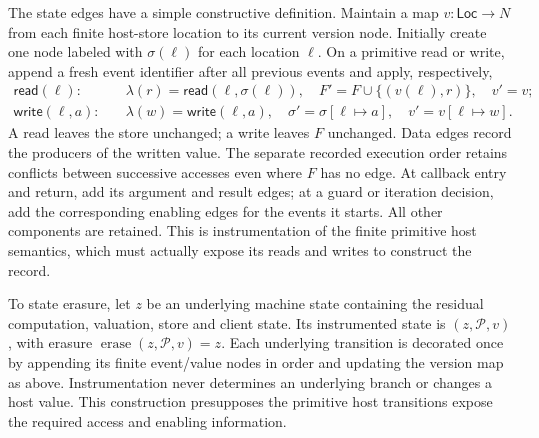 The state edges have a simple constructive definition. Maintain a map
$v:\mathsf{Loc}\to N$ from each finite host-store location to its current
version node. Initially create one node labeled with $\sigma(\ell)$ for each
location $\ell$. On a primitive read or write, append a fresh event identifier
after all previous events and apply, respectively,
\[
\begin{aligned}
 \mathsf{read}(\ell):\quad
 &\lambda(r)=\mathsf{read}(\ell,\sigma(\ell)),\quad
 F'=F\cup\{(v(\ell),r)\},\quad v'=v;\\
 \mathsf{write}(\ell,a):\quad
 &\lambda(w)=\mathsf{write}(\ell,a),\quad
 \sigma'=\sigma[\ell\mapsto a],\quad v'=v[\ell\mapsto w].
\end{aligned}
\]
A read leaves the store unchanged; a write leaves $F$ unchanged. Data edges
record the producers of the written value. The separate recorded execution
order retains conflicts between successive accesses even where $F$ has no
edge. At callback entry and return, add its argument and result edges; at a
guard or iteration decision, add the corresponding enabling edges for the
events it starts. All other components are retained. This is instrumentation
of the finite primitive host semantics, which must actually expose its reads
and writes to construct the record.

To state erasure, let $z$ be an underlying machine state containing the
residual computation, valuation, store and client state. Its instrumented
state is $(z,\mathcal P,v)$, with erasure
$\operatorname{erase}(z,\mathcal P,v)=z$. Each underlying transition is
decorated once by appending its finite event/value nodes in order and updating
the version map as above. Instrumentation never determines an underlying
branch or changes a host value. This construction presupposes the primitive
host transitions expose the required access and enabling information.

